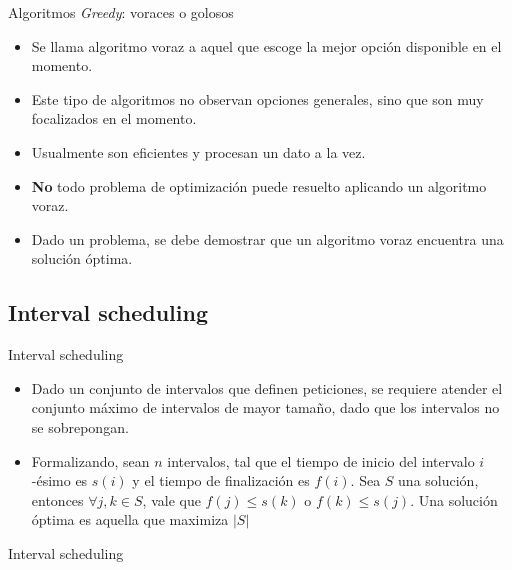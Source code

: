 \documentclass[]{beamer}
\begin{document}
\begin{frame}{Algoritmos \textit{Greedy}: voraces o golosos}
  \begin{itemize}
    \item Se llama algoritmo voraz a aquel que escoge la mejor opci\'on disponible en el momento.
      \pause
    \item Este tipo de algoritmos no observan opciones generales, sino que son muy focalizados en el momento.
      \pause
    \item Usualmente son eficientes y procesan un dato a la vez.
      \pause
    \item \textbf{No} todo problema de optimizaci\'on puede resuelto aplicando un algoritmo voraz.
      \pause
    \item Dado un problema, se debe demostrar que un algoritmo voraz encuentra una soluci\'on \'optima.
  \end{itemize}
\end{frame}

\subsection{Interval scheduling}
\begin{frame}{Interval scheduling}
  \begin{itemize}
    \item Dado un conjunto de intervalos que definen peticiones, se requiere atender el conjunto m\'aximo de intervalos de mayor tama\~no, dado que los intervalos no se sobrepongan.
      \pause
    \item Formalizando, sean $n$ intervalos, tal que el tiempo de inicio del intervalo $i$-\'esimo es $s(i)$ y el tiempo de finalizaci\'on es $f(i)$. Sea $S$ una soluci\'on, entonces $ \forall j, k \in S$, vale que $f(j)\leq s(k)$ o $f(k)\leq s(j)$. Una soluci\'on \'optima es aquella que maximiza $|S|$
  \end{itemize}
\end{frame}

\begin{frame}{Interval scheduling}
\end{frame}
\end{document}
